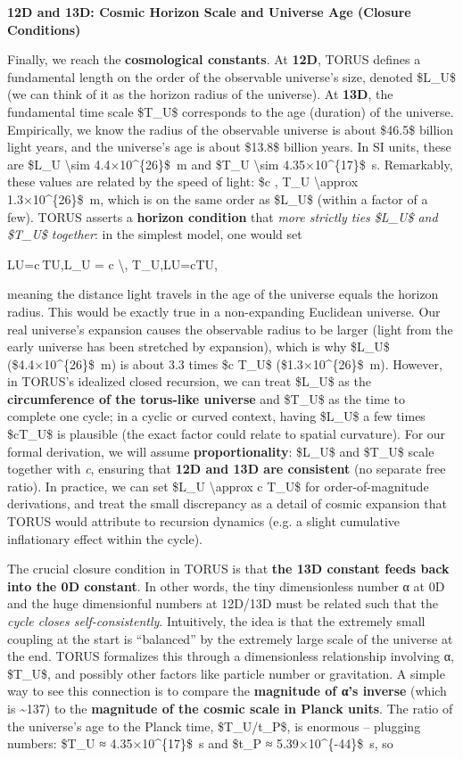 \documentclass[]{article}
\begin{document}
\textbf{12D and 13D: Cosmic Horizon Scale and Universe Age (Closure
Conditions)}

Finally, we reach the \textbf{cosmological constants}. At \textbf{12D},
TORUS defines a fundamental length on the order of the observable
universe's size, denoted \$L\_U\$ (we can think of it as the horizon
radius of the universe). At \textbf{13D}, the fundamental time scale
\$T\_U\$ corresponds to the age (duration) of the universe. Empirically,
we know the radius of the observable universe is about \$46.5\$ billion
light years, and the universe's age is about \$13.8\$ billion years. In
SI units, these are \$L\_U \textbackslash{}sim 4.4×10\^{}\{26\}\$~m and
\$T\_U \textbackslash{}sim 4.35×10\^{}\{17\}\$~s. Remarkably, these
values are related by the speed of light: \$c , T\_U
\textbackslash{}approx 1.3×10\^{}\{26\}\$~m, which is on the same order
as \$L\_U\$ (within a factor of a few). TORUS asserts a \textbf{horizon
condition} that \emph{more strictly ties \$L\_U\$ and \$T\_U\$
together}: in the simplest model, one would set

LU=c TU,L\_U = c \textbackslash{}, T\_U,LU​=cTU​,

meaning the distance light travels in the age of the universe equals the
horizon radius. This would be exactly true in a non-expanding Euclidean
universe. Our real universe's expansion causes the observable radius to
be larger (light from the early universe has been stretched by
expansion), which is why \$L\_U\$ (\$4.4×10\^{}\{26\}\$~m) is about 3.3
times \$c T\_U\$ (\$1.3×10\^{}\{26\}\$~m). However, in TORUS's idealized
closed recursion, we can treat \$L\_U\$ as the \textbf{circumference of
the torus-like universe} and \$T\_U\$ as the time to complete one cycle;
in a cyclic or curved context, having \$L\_U\$ a few times \$cT\_U\$ is
plausible (the exact factor could relate to spatial curvature). For our
formal derivation, we will assume \textbf{proportionality}: \$L\_U\$ and
\$T\_U\$ scale together with \emph{c}, ensuring that \textbf{12D and 13D
are consistent} (no separate free ratio). In practice, we can set \$L\_U
\textbackslash{}approx c T\_U\$ for order-of-magnitude derivations, and
treat the small discrepancy as a detail of cosmic expansion that TORUS
would attribute to recursion dynamics (e.g. a slight cumulative
inflationary effect within the cycle).

The crucial closure condition in TORUS is that \textbf{the 13D constant
feeds back into the 0D constant}. In other words, the tiny dimensionless
number α at 0D and the huge dimensionful numbers at 12D/13D must be
related such that the \emph{cycle closes self-consistently}.
Intuitively, the idea is that the extremely small coupling at the start
is ``balanced'' by the extremely large scale of the universe at the end.
TORUS formalizes this through a dimensionless relationship involving α,
\$T\_U\$, and possibly other factors like particle number or
gravitation. A simple way to see this connection is to compare the
\textbf{magnitude of α's inverse} (which is \textasciitilde{}137) to the
\textbf{magnitude of the cosmic scale in Planck units}. The ratio of the
universe's age to the Planck time, \$T\_U/t\_P\$, is enormous --
plugging numbers: \$T\_U ≈ 4.35×10\^{}\{17\}\$~s and \$t\_P ≈
5.39×10\^{}\{-44\}\$~s, so
\end{document}
